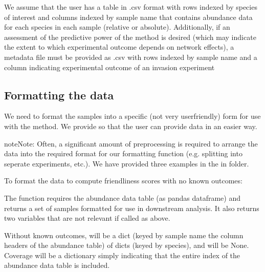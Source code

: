 \documentclass[letterpaper,10pt,english]{sphinxmanual}
\begin{document}
\sphinxAtStartPar
We assume that the user has a table in .csv format with rows indexed by species of interest and columns indexed by sample name that contains abundance data for each species in each sample (relative or absolute). Additionally, if an assessment of the predictive power of the method is desired (which may indicate
the extent to which experimental outcome depends on network effects), a metadata file must be provided as .csv with rows indexed by sample name and a column indicating experimental outcome of an invasion experiment


\subsection{Formatting the data}
\label{\detokenize{usage:formatting-the-data}}
\sphinxAtStartPar
We need to format the samples into a specific (not very user\sphinxhyphen{}friendly) form for use with the method. We provide {\hyperref[\detokenize{format::doc}]{}} so that the user can provide data in an easier way.

\begin{sphinxadmonition}{note}{Note:}
\sphinxAtStartPar
Often, a significant amount of pre\sphinxhyphen{}processing is required to arrange the data into the required format for our formatting function (e.g. splitting into seperate experiments, etc.). We have provided three examples in the in
 folder.
\end{sphinxadmonition}

\sphinxAtStartPar
To format the data to compute friendliness scores with no known outcomes:

\begin{sphinxVerbatim}[commandchars=\\\{\}]
   

  
\end{sphinxVerbatim}

\sphinxAtStartPar
The function requires the abundance data table (as pandas dataframe) and returns a set of samples formatted for use in downstream analysis. It also returns two variables that are not relevant if called as above.

\sphinxAtStartPar
Without known outcomes,  will be a dict (keyed by sample name \sphinxhyphen{} the column headers of the abundance table)
of dicts (keyed by species), and  will be None. Coverage will be a dictionary simply indicating that the entire index of the abundance data table is included.
\end{document}
